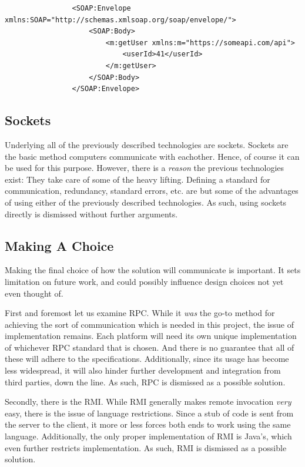 			\begin{verbatim}
				<SOAP:Envelope xmlns:SOAP="http://schemas.xmlsoap.org/soap/envelope/">
				    <SOAP:Body>
				        <m:getUser xmlns:m="https://someapi.com/api">
				            <userId>41</userId>
				        </m:getUser>
				    </SOAP:Body>
				</SOAP:Envelope>
			\end{verbatim}

		\subsection{Sockets}
			Underlying all of the previously described technologies are sockets. Sockets are the basic method computers communicate with eachother. Hence, of course it can be used for this purpose. However, there is a \emph{reason} the previous technologies exist: They take care of some of the heavy lifting. Defining a standard for communication, redundancy, standard errors, etc. are but some of the advantages of using either of the previously described technologies. As such, using sockets directly is dismissed without further arguments. 

		\subsection{Making A Choice}
			Making the final choice of how the solution will communicate is important. It sets limitation on future work, and could possibly influence design choices not yet even thought of. 

			First and foremost let us examine RPC. While it \emph{was} the go-to method for achieving the sort of communication which is needed in this project, the issue of implementation remains. Each platform will need its own unique implementation of whichever RPC standard that is chosen. And there is no guarantee that all of these will adhere to the specifications. Additionally, since its usage has become less widespread, it will also hinder further development and integration from third parties, down the line. As such, RPC is dismissed as a possible solution.

			Secondly, there is the RMI. While RMI generally makes remote invocation \emph{very} easy, there is the issue of language restrictions. Since a stub of code is sent from the server to the client, it more or less forces both ends to work using the same language. Additionally, the only proper implementation of RMI is Java's, which even further restricts implementation. As such, RMI is dismissed as a possible solution.

